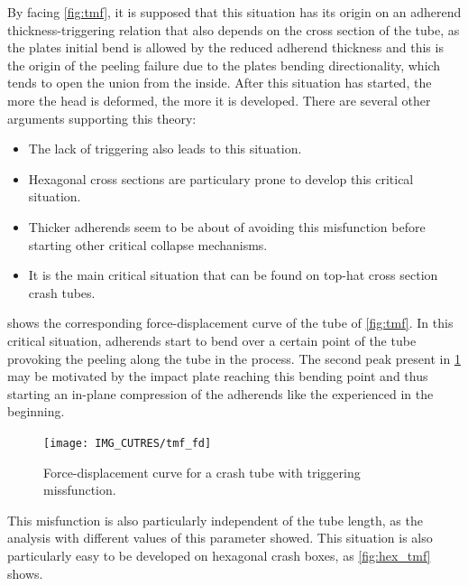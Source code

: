 \documentclass[cmfonts]{witpress}
\begin{document}
By facing \cref{fig:tmf}, it is supposed that this situation has its origin on an adherend thickness-triggering relation that also depends on the cross section of the tube, as the plates initial bend is allowed by the reduced adherend thickness and this is the origin of the peeling failure due to the plates bending directionality, which tends to open the union from the inside. After this situation has started, the more the head is deformed, the more it is developed. There are several other arguments supporting this theory:
\begin{itemize}
	\item The lack of triggering also leads to this situation.

	\item Hexagonal cross sections \cite{Yang2012} are particulary prone to develop this critical situation.

	\item Thicker adherends seem to be about of avoiding this misfunction before starting other critical collapse mechanisms.

	\item It is the main critical situation that can be found on top-hat cross section crash tubes.
\end{itemize}

 shows the corresponding force-displacement curve of the tube of \cref{fig:tmf}. In this critical situation, adherends start to bend over a certain point of the tube provoking the peeling along the tube in the process. The second peak present in \cref{fig:tmf_fd} may be motivated by the impact plate reaching this bending point and thus starting an in-plane compression of the adherends like the experienced in the beginning.

\begin{figure}
	\centering
	\texttt{[image: IMG\_CUTRES/tmf\_fd]}
	\caption{Force-displacement curve for a crash tube with triggering missfunction.}
	\label{fig:tmf_fd}
\end{figure}

This misfunction is also particularly independent of the tube length, as the analysis with different values of this parameter showed. This situation is also particularly easy to be developed on hexagonal crash boxes, as \cref{fig:hex_tmf} shows.
\end{document}
